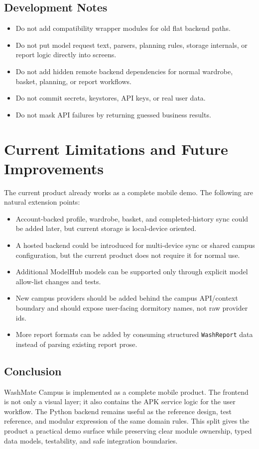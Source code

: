 \documentclass[11pt,a4paper]{article}
\begin{document}
\subsection{Development Notes}

\begin{itemize}
  \item Do not add compatibility wrapper modules for old flat backend paths.
  \item Do not put model request text, parsers, planning rules, storage internals, or report logic directly into screens.
  \item Do not add hidden remote backend dependencies for normal wardrobe, basket, planning, or report workflows.
  \item Do not commit secrets, keystores, API keys, or real user data.
  \item Do not mask API failures by returning guessed business results.
\end{itemize}

\section{Current Limitations and Future Improvements}

The current product already works as a complete mobile demo. The following are natural extension points:

\begin{itemize}
  \item Account-backed profile, wardrobe, basket, and completed-history sync could be added later, but current storage is local-device oriented.
  \item A hosted backend could be introduced for multi-device sync or shared campus configuration, but the current product does not require it for normal use.
  \item Additional ModelHub models can be supported only through explicit model allow-list changes and tests.
  \item New campus providers should be added behind the campus API/context boundary and should expose user-facing dormitory names, not raw provider ids.
  \item More report formats can be added by consuming structured \texttt{WashReport} data instead of parsing existing report prose.
\end{itemize}

\subsection{Conclusion}

WashMate Campus is implemented as a complete mobile product. The frontend is not only a visual layer; it also contains the APK service logic for the user workflow. The Python backend remains useful as the reference design, test reference, and modular expression of the same domain rules. This split gives the product a practical demo surface while preserving clear module ownership, typed data models, testability, and safe integration boundaries.
\end{document}
